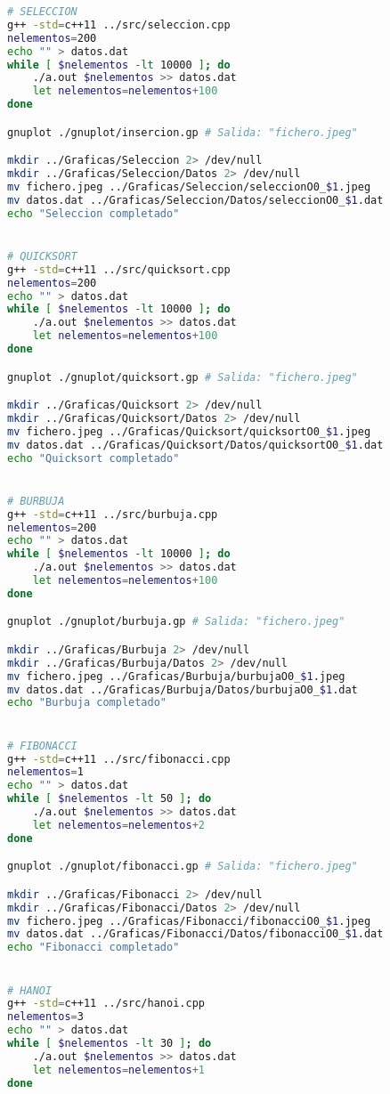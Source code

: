 \documentclass[11pt,spanish]{article} %
\begin{document}
\begin{lstlisting}[language=bash]
# SELECCION
g++ -std=c++11 ../src/seleccion.cpp
nelementos=200
echo "" > datos.dat
while [ $nelementos -lt 10000 ]; do
    ./a.out $nelementos >> datos.dat
    let nelementos=nelementos+100
done

gnuplot ./gnuplot/insercion.gp # Salida: "fichero.jpeg"

mkdir ../Graficas/Seleccion 2> /dev/null
mkdir ../Graficas/Seleccion/Datos 2> /dev/null
mv fichero.jpeg ../Graficas/Seleccion/seleccionO0_$1.jpeg
mv datos.dat ../Graficas/Seleccion/Datos/seleccionO0_$1.dat
echo "Seleccion completado"


# QUICKSORT
g++ -std=c++11 ../src/quicksort.cpp
nelementos=200
echo "" > datos.dat
while [ $nelementos -lt 10000 ]; do
    ./a.out $nelementos >> datos.dat
    let nelementos=nelementos+100
done

gnuplot ./gnuplot/quicksort.gp # Salida: "fichero.jpeg"

mkdir ../Graficas/Quicksort 2> /dev/null
mkdir ../Graficas/Quicksort/Datos 2> /dev/null
mv fichero.jpeg ../Graficas/Quicksort/quicksortO0_$1.jpeg
mv datos.dat ../Graficas/Quicksort/Datos/quicksortO0_$1.dat
echo "Quicksort completado"


# BURBUJA
g++ -std=c++11 ../src/burbuja.cpp
nelementos=200
echo "" > datos.dat
while [ $nelementos -lt 10000 ]; do
    ./a.out $nelementos >> datos.dat
    let nelementos=nelementos+100
done

gnuplot ./gnuplot/burbuja.gp # Salida: "fichero.jpeg"

mkdir ../Graficas/Burbuja 2> /dev/null
mkdir ../Graficas/Burbuja/Datos 2> /dev/null
mv fichero.jpeg ../Graficas/Burbuja/burbujaO0_$1.jpeg
mv datos.dat ../Graficas/Burbuja/Datos/burbujaO0_$1.dat
echo "Burbuja completado"


# FIBONACCI
g++ -std=c++11 ../src/fibonacci.cpp
nelementos=1
echo "" > datos.dat
while [ $nelementos -lt 50 ]; do
    ./a.out $nelementos >> datos.dat
    let nelementos=nelementos+2
done

gnuplot ./gnuplot/fibonacci.gp # Salida: "fichero.jpeg"

mkdir ../Graficas/Fibonacci 2> /dev/null
mkdir ../Graficas/Fibonacci/Datos 2> /dev/null
mv fichero.jpeg ../Graficas/Fibonacci/fibonacciO0_$1.jpeg
mv datos.dat ../Graficas/Fibonacci/Datos/fibonacciO0_$1.dat
echo "Fibonacci completado"


# HANOI
g++ -std=c++11 ../src/hanoi.cpp
nelementos=3
echo "" > datos.dat
while [ $nelementos -lt 30 ]; do
    ./a.out $nelementos >> datos.dat
    let nelementos=nelementos+1
done


\end{lstlisting}
\end{document}
